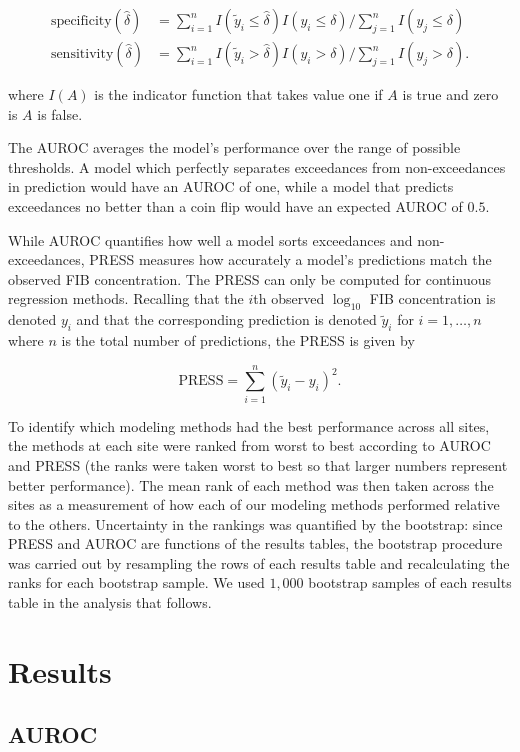 \documentclass[authoryear,review, 12pt]{elsarticle}
\begin{document}
\begin{align*}
\text{specificity}(\hat{\delta}) &= \sum_{i=1}^n I(\tilde{y}_i \le \hat{\delta}) I(y_i \le \delta) / \sum_{j=1}^n I(y_j \le \delta) \\
\text{sensitivity}(\hat{\delta}) &= \sum_{i=1}^n I(\tilde{y}_i > \hat{\delta}) I(y_i > \delta) / \sum_{j=1}^n I(y_j > \delta).
\end{align*}

where \(I(A)\) is the indicator function that takes value one if \(A\)
is true and zero is \(A\) is false.

The AUROC averages the model's performance over the range of possible
thresholds. A model which perfectly separates exceedances from
non-exceedances in prediction would have an AUROC of one, while a model
that predicts exceedances no better than a coin flip would have an
expected AUROC of \(0.5\).

While AUROC quantifies how well a model sorts exceedances and
non-exceedances, PRESS measures how accurately a model's predictions
match the observed FIB concentration. The PRESS can only be computed for
continuous regression methods. Recalling that the \(i\)th observed
\(\log_{10}\) FIB concentration is denoted \(y_{i}\) and that the
corresponding prediction is denoted \(\tilde{y}_i\) for \(i=1,\dots,n\)
where \(n\) is the total number of predictions, the PRESS is given by

\[\text{PRESS}=\sum_{i=1}^{n}\left(\tilde{y}_{i}-y_{i}\right)^{2}.\]

To identify which modeling methods had the best performance across all
sites, the methods at each site were ranked from worst to best according
to AUROC and PRESS (the ranks were taken worst to best so that larger
numbers represent better performance). The mean rank of each method was
then taken across the sites as a measurement of how each of our modeling
methods performed relative to the others. Uncertainty in the rankings
was quantified by the bootstrap: since PRESS and AUROC are functions of
the results tables, the bootstrap procedure was carried out by
resampling the rows of each results table and recalculating the ranks
for each bootstrap sample. We used \(1,000\) bootstrap samples of each
results table in the analysis that follows.

\section{Results}\label{results}

\subsection{AUROC}\label{auroc}
\end{document}
